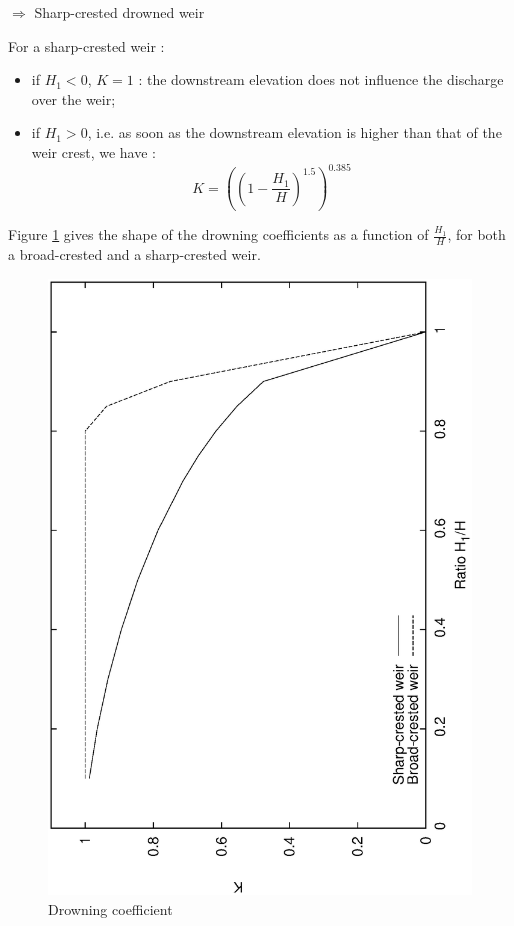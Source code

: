 \vspace{0.5cm}

$\Longrightarrow$ Sharp-crested drowned weir

\vspace{0.5cm}

For a sharp-crested weir :
\begin{itemize}
 \item if $H_1 < 0$, $K=1$ : the downstream elevation does not influence the discharge over the weir;
 \item if $H_1 > 0$, i.e. as soon as the downstream elevation is higher than that of the weir crest, we have :
   \begin{equation}
     K = \left ( \left ( 1 - \frac{H_1}{H} \right )^{1.5} \right )^{0.385}
   \end{equation}
\end{itemize}

\vspace{0.5cm}

Figure \ref{CFEN} gives the shape of the drowning coefficients as a function of $\frac{H_1}{H}$, for both a broad-crested and a sharp-crested weir.

\begin{figure}
    \begin{center}
     \includegraphics[scale=0.5,angle=270]{Figures/CoefEn.eps}
     \caption{Drowning coefficient}
     \label{CFEN}
    \end{center}
\end{figure}


